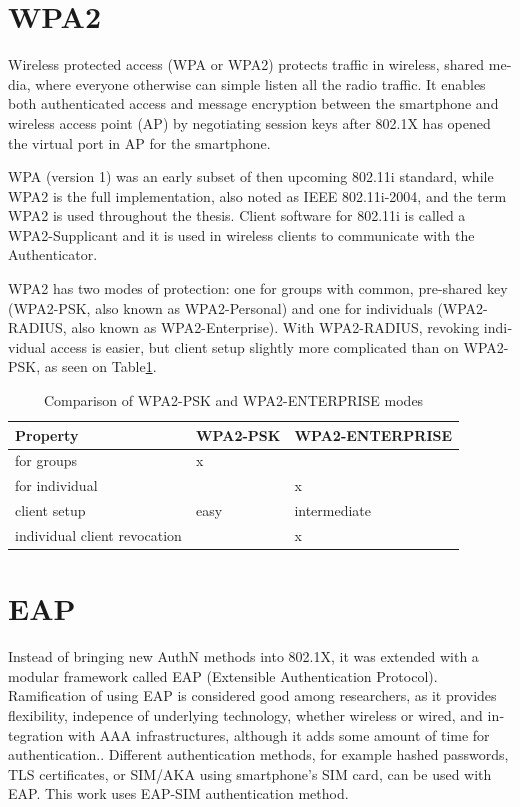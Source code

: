 \documentclass[12pt,a4paper,english]{tutthesis}
\begin{document}
\begin{otherlanguage}{english}
\section{WPA2}
\label{sec-2-3}

Wireless protected access (WPA or WPA2) protects traffic in wireless,
shared media, where everyone otherwise can simple listen all the radio traffic.
It enables both authenticated access and message
encryption between the smartphone and wireless access point (AP) by negotiating session keys
after 802.1X has opened the virtual port in AP for the smartphone.

WPA (version 1)  was an early subset of then upcoming 802.11i standard,
while WPA2 is the full implementation, also noted as IEEE
802.11i-2004, and the term WPA2 is used throughout the thesis.
Client software for 802.11i is called a WPA2-Supplicant and it is used
in wireless clients to communicate with the Authenticator. 

WPA2 has two modes of protection: one for groups with common, pre-shared
key (WPA2-PSK, also known as WPA2-Personal) and one for individuals
(WPA2-RADIUS, also known as  WPA2-Enterprise).  With WPA2-RADIUS, revoking
individual access is easier, but client setup slightly more
complicated than on WPA2-PSK, as seen on Table\ref{psk-enterprise}.

\begin{table}[htb]
\caption{\label{psk-enterprise}Comparison of WPA2-PSK and WPA2-ENTERPRISE modes}
\centering
\begin{tabular}{l|l|l}
Property & WPA2-PSK & WPA2-ENTERPRISE\\
\hline
for groups & x & \\
for individual &  & x\\
client setup & easy & intermediate\\
individual client revocation &  & x\\
\hline
\end{tabular}
\end{table}


\section{EAP}
\label{sec-2-4}

Instead of bringing new AuthN methods into 802.1X, it was 
extended with a modular framework called 
 EAP (Extensible Authentication Protocol)\cite{rfc5247}. 
Ramification of using EAP is considered good among researchers, as it
provides flexibility, indepence of underlying technology, whether
wireless or wired,  and integration with AAA infrastructures, although
it adds some amount of time for authentication.\cite{pereniguez10}.
Different authentication methods, for example hashed passwords, TLS
 certificates, or SIM/AKA using smartphone's SIM card,  can
be used with EAP.
This work uses EAP-SIM authentication method.



\end{otherlanguage}
\end{document}
